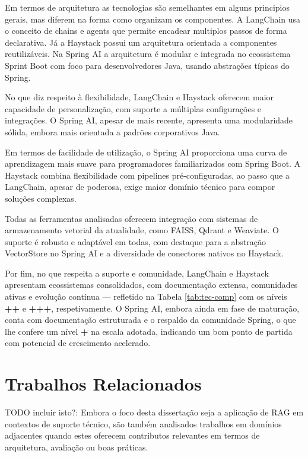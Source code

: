 Em termos de arquitetura as tecnologias são semelhantes em alguns principios gerais, mas diferem na forma como organizam os componentes. A LangChain usa o conceito de chains e agents que permite encadear multiplos passos de forma declarativa. Já a Haystack possui um arquitetura orientada a componentes reutilizáveis. Na Spring AI a arquitetura é modular e integrada no ecossistema Sprint Boot com foco para desenvolvedores Java, usando abstrações típicas do Spring. 


No que diz respeito à flexibilidade, LangChain e Haystack oferecem maior capacidade de personalização, com suporte a múltiplas configurações e integrações. O Spring AI, apesar de mais recente, apresenta uma modularidade sólida, embora mais orientada a padrões corporativos Java.

Em termos de facilidade de utilização, o Spring AI proporciona uma curva de aprendizagem mais suave para programadores familiarizados com Spring Boot. A Haystack combina flexibilidade com pipelines pré-configuradas, ao passo que a LangChain, apesar de poderosa, exige maior domínio técnico para compor soluções complexas.

Todas as ferramentas analisadas oferecem integração com sistemas de armazenamento vetorial da atualidade, como FAISS, Qdrant e Weaviate. O suporte é robusto e adaptável em todas, com destaque para a abstração VectorStore no Spring AI e a diversidade de conectores nativos no Haystack.

Por fim, no que respeita a suporte e comunidade, LangChain e Haystack apresentam ecossistemas consolidados, com documentação extensa, comunidades ativas e evolução contínua — refletido na Tabela \ref{tab:tec-comp} com os níveis \textbf{++} e \textbf{+++}, respetivamente. O Spring AI, embora ainda em fase de maturação, conta com documentação estruturada e o respaldo da comunidade Spring, o que lhe confere um nível \textbf{+} na escala adotada, indicando um bom ponto de partida com potencial de crescimento acelerado.

        

\section{Trabalhos Relacionados}

TODO incluir isto?: Embora o foco desta dissertação seja a aplicação de RAG em contextos de suporte técnico, são também analisados trabalhos em domínios adjacentes quando estes oferecem contributos relevantes em termos de arquitetura, avaliação ou boas práticas.


